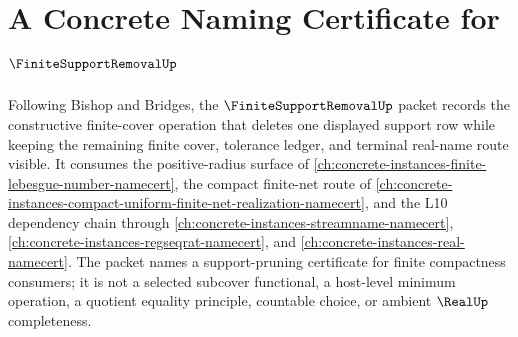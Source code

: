 \chapter{A Concrete Naming Certificate for $\FiniteSupportRemovalUp$}
\label{ch:concrete-instances-finite-support-removal-namecert}

Following Bishop and Bridges, the $\FiniteSupportRemovalUp$ packet records the constructive finite-cover operation that deletes one displayed support row while keeping the remaining finite cover, tolerance ledger, and terminal real-name route visible. It consumes the positive-radius surface of \autoref{ch:concrete-instances-finite-lebesgue-number-namecert}, the compact finite-net route of \autoref{ch:concrete-instances-compact-uniform-finite-net-realization-namecert}, and the L10 dependency chain through \autoref{ch:concrete-instances-streamname-namecert}, \autoref{ch:concrete-instances-regseqrat-namecert}, and \autoref{ch:concrete-instances-real-namecert}. The packet names a support-pruning certificate for finite compactness consumers; it is not a selected subcover functional, a host-level minimum operation, a quotient equality principle, countable choice, or ambient $\RealUp$ completeness.

